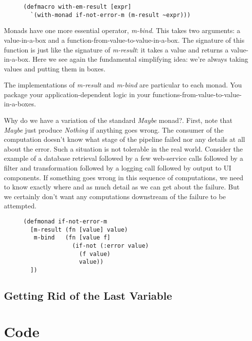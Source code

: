 \documentclass[11pt]{article}
\begin{document}
\begin{figure}[H]
\label{with-em-result-macro}
\begin{verbatim}
(defmacro with-em-result [expr]
  `(with-monad if-not-error-m (m-result ~expr)))
\end{verbatim}
\end{figure}

Monads have one more essential operator, \emph{m-bind}. This takes two
arguments: a value-in-a-box and a
function-from-value-to-value-in-a-box. The signature of this
function is just like the signature of \emph{m-result}: it takes a value
and returns a value-in-a-box. Here we see again the fundamental
simplifying idea: we're always taking values and putting them in
boxes.

The implementations of \emph{m-result} and \emph{m-bind} are particular to
each monad. You package your application-dependent logic in your
functions-from-value-to-value-in-a-boxes.

Why do we have a variation of the standard \emph{Maybe} monad?. First,
note that \emph{Maybe} just produce \emph{Nothing} if anything goes wrong.
The consumer of the computation doesn't know what stage of the
pipeline failed nor any details at all about the error. Such a
situation is not tolerable in the real world. Consider the example
of a database retrieval followed by a few web-service calls
followed by a filter and transformation followed by a logging call
followed by output to UI components. If something goes wrong in
this sequence of computations, we need to know exactly where and as
much detail as we can get about the failure. But we certainly don't
want any computations downstream of the failure to be attempted.


\begin{figure}[H]
\label{if-not-error-monad}
\begin{verbatim}
(defmonad if-not-error-m
  [m-result (fn [value] value)
   m-bind   (fn [value f]
              (if-not (:error value)
                (f value) 
                value))
  ])
\end{verbatim}
\end{figure}
\subsection{Getting Rid of the Last Variable}
\label{sec-3-3}


\section{Code}
\label{sec-4}
\end{document}
